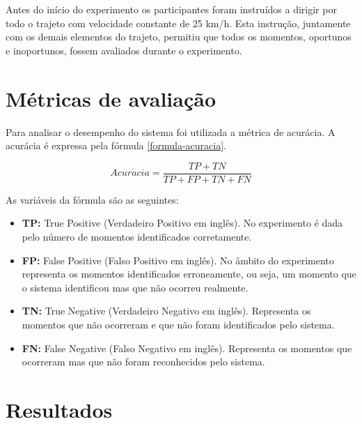 Antes do início do experimento os participantes foram instruídos a dirigir por todo o trajeto com
velocidade constante de 25 km/h. Esta instrução, juntamente com os demais elementos do trajeto,
permitiu que todos os momentos, oportunos e inoportunos, fossem avaliados durante o experimento.

\section{Métricas de avaliação}
\label{metricas}

Para analisar o desempenho do sistema foi utilizada a métrica de acurácia. A acurácia é expressa pela
fórmula \ref{formula-acuracia}.

\begin{equation}
  Acur\acute{a}cia = \frac{TP + TN}{TP + FP + TN + FN}
\label{formula-acuracia}
\end{equation}

As variáveis da fórmula são as seguintes:

\begin{itemize}
  \item \textbf{TP:} True Positive (Verdadeiro Positivo em inglês). No experimento é dada pelo número de
  momentos identificados corretamente.
  \item \textbf{FP:} False Positive (Falso Positivo em inglês). No âmbito do experimento representa os
  momentos identificados erroneamente, ou seja, um momento que o sistema identificou mas que não ocorreu
  realmente.
  \item \textbf{TN:} True Negative (Verdadeiro Negativo em inglês). Representa os momentos que não ocorreram
  e que não foram identificados pelo sistema.
  \item \textbf{FN:} False Negative (Falso Negativo em inglês). Representa os momentos que ocorreram mas
  que não foram reconhecidos pelo sistema.
\end{itemize}

\section{Resultados}
\label{resultados}
